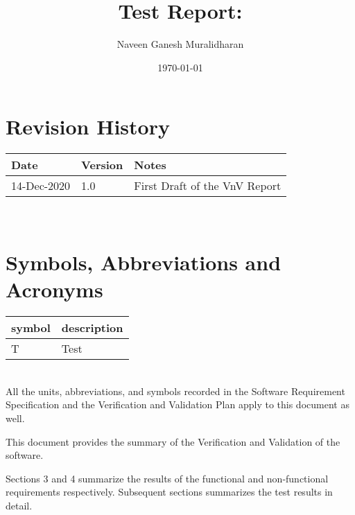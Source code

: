 \documentclass[12pt, titlepage]{article}
\begin{document}
\title{Test Report: \progname{}} 
\author{Naveen Ganesh Muralidharan}
\date{\today}
	
\maketitle


\section{Revision History}

\begin{tabularx}{\textwidth}{p{3cm}p{2cm}X}
\toprule {\bf Date} & {\bf Version} & {\bf Notes}\\
\midrule
14-Dec-2020 & 1.0 & First Draft of the VnV Report\\

\bottomrule
\end{tabularx}

~\newpage

\section{Symbols, Abbreviations and Acronyms}

\renewcommand{\arraystretch}{1.2}
\begin{tabular}{l l} 
  \toprule		
  \textbf{symbol} & \textbf{description}\\
  \midrule 
  T & Test\\
  \bottomrule
\end{tabular}\\

All the units, abbreviations, and symbols recorded in the Software Requirement 
Specification \cite{SRS} and the Verification and Validation Plan \cite{VnVPlan}  
apply to this document as well.


\newpage

\tableofcontents

\listoftables %

\newpage


This document provides the summary of the Verification and Validation of the 
\progname{} software. 

Sections 3 and 4 summarize the results of the functional and non-functional
requirements respectively. Subsequent sections summarizes the test results
in detail.
\end{document}

